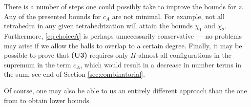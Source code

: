 \begin{remark}
	There is a number of steps one could possibly take to improve the bounds for $z$. Any of the presented bounds for $c_A$ are not minimal. For example, not all tetrahedra in any given tetrahedrization will attain the bounds $\chi_1$ and $\chi_2$. Furthermore, \eqref{eq:choiceA} is perhaps unnecessarily conservative --- no problems may arise if we allow the balls to overlap to a certain degree. Finally, it may be possible to prove that \textbf{(U3)} requires only $\Pi$-almost all configurations in the supremum in the term $c_A$, which would result in a decrease in number terms in the sum, see end of Section \ref{sec:combinatorial}.

	Of course, one may also be able to us an entirely different approach than the one from \cite{DDG12} to obtain lower bounds.
\end{remark}



